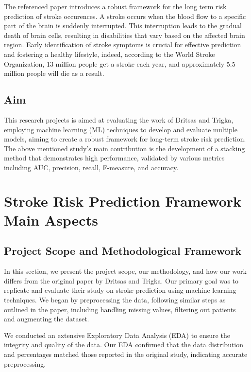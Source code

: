 \documentclass{Configuration_Files/Template}
\begin{document}
The referenced paper introduces a robust framework for the long term risk prediction of stroke occurences.
A stroke occurs when the blood flow to a specific part of the brain is suddenly interrupted. This interruption leads to the gradual death of brain cells, resulting in disabilities that vary based on the affected brain region. Early identification of stroke symptoms is crucial for effective prediction and fostering a healthy lifestyle, indeed, according to the World Stroke Organization, 13 million people get a stroke each year, and approximately 5.5 million people will die as a result.





\section{Aim}

This research projects is aimed at evaluating the work of Dritsas and Trigka\cite{s22134670}, employing machine learning (ML) techniques to develop and evaluate multiple models, aiming to create a robust framework for long-term stroke risk prediction. The above mentioned study's main contribution is the development of a stacking method that demonstrates high performance, validated by various metrics including AUC, precision, recall, F-measure, and accuracy. 

\chapter{Stroke Risk Prediction Framework Main Aspects}

\section{Project Scope and Methodological Framework}

In this section, we present the project scope, our methodology, and how our work differs from the original paper by Dritsas and Trigka. Our primary goal was to replicate and evaluate their study on stroke prediction using machine learning techniques. We began by preprocessing the data, following similar steps as outlined in the paper, including handling missing values, filtering out patients and augmenting the dataset.

We conducted an extensive Exploratory Data Analysis (EDA) to ensure the integrity and quality of the data. Our EDA confirmed that the data distribution and percentages matched those reported in the original study, indicating accurate preprocessing.
\end{document}
